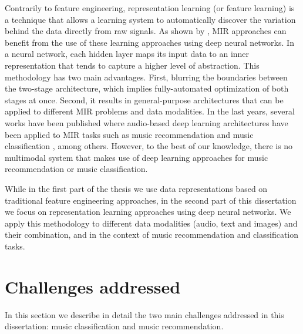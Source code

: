 Contrarily to feature engineering, representation learning (or feature learning) is a technique that allows a learning system to automatically discover the variation behind the data directly from raw signals. As shown by \cite{humphrey2012}, MIR approaches can benefit from the use of these learning approaches using deep neural networks. 
In a neural network, each hidden layer maps its input data to an inner representation that tends to capture a higher level of abstraction.
This methodology has two main advantages. First, blurring the boundaries between the two-stage architecture, which implies fully-automated optimization of both stages at once. Second, it results in general-purpose architectures that can be applied to different MIR problems and data modalities. In the last years, several works have been published where audio-based deep learning architectures have been applied to MIR tasks such as music recommendation \citep{Oord2013} and music classification \citep{Choi2016}, among others. However, to the best of our knowledge, there is no multimodal system that makes use of deep learning approaches for music recommendation or music classification.

While in the first part of the thesis we use data representations based on traditional feature engineering approaches, in the second part of this dissertation we focus on representation learning approaches using deep neural networks. We apply this methodology to different data modalities (audio, text and images) and their combination, and in the context of music recommendation and classification tasks.

\section{Challenges addressed}

In this section we describe in detail the two main challenges addressed in this dissertation: music classification and music recommendation.

